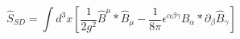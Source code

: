 \begin{equation}
\hat S_{SD}=\int d^{3}x[\frac{1}{2g^2}\hat B^\mu *\hat B_\mu-\frac{1}{8\pi}\epsilon ^{\alpha\beta\gamma}\hat B_\alpha *\partial _\beta \hat B_\gamma ]
\label{ncsd}
\end{equation}

